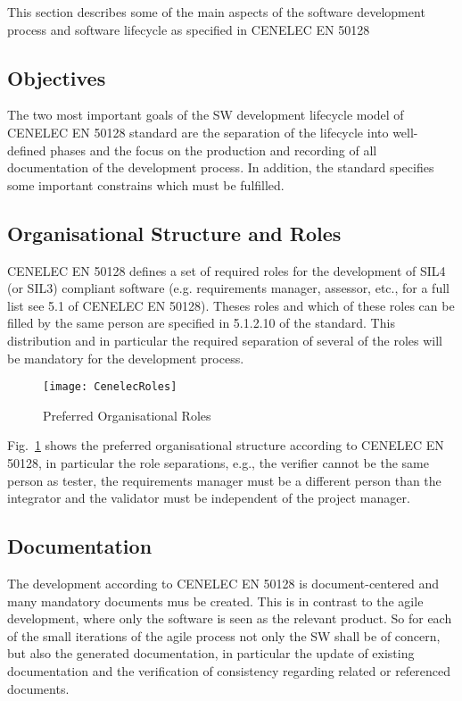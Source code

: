 
This section describes some of the main aspects of the software development
process and software lifecycle as specified in CENELEC EN 50128

\subsection{Objectives}
\label{sec:objectives}

The two most important goals of the SW development lifecycle model of CENELEC EN
50128 standard are the separation of the lifecycle into well-defined phases and
the focus on the production and recording of all documentation of the
development process. In addition, the standard specifies some important
constrains which must be fulfilled.

\subsection{Organisational Structure and Roles}
\label{sec:organ-struct-roles}

CENELEC EN 50128 defines a set of required roles for the development of SIL4 (or
SIL3) compliant software (e.g. requirements manager, assessor, etc., for a full
list see 5.1 of CENELEC EN 50128). Theses roles and which of these roles can be
filled by the same person are specified in 5.1.2.10 of the standard. This
distribution and in particular the required separation of several of the roles
will be mandatory for the development process.

\begin{figure}[ht]
  \centering
  \texttt{[image: CenelecRoles]}
  \caption{Preferred Organisational Roles~\cite{EN-50128}}
  \label{fig:preferred-roles}
\end{figure}

Fig.~\ref{fig:preferred-roles} shows the preferred organisational structure
according to CENELEC EN 50128, in particular  the role separations,
e.g., the verifier cannot be the same person as tester, the requirements
manager must be a different person than the integrator and the validator must be
independent of the project manager.

\subsection{Documentation}
\label{sec:documentation}

The development according to CENELEC EN 50128 is document-centered and many
mandatory documents mus be created. This is in contrast to the agile
development, where only the software is seen as the relevant product. So for
each of the small iterations of the agile process not only the SW shall be of
concern, but also the generated documentation, in particular the update of
existing documentation and the verification of consistency regarding related or
referenced documents.

